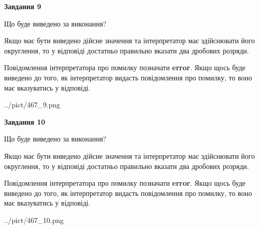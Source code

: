\documentclass[12pt, ukrainian]{article}
\begin{document}
{\begin {Large}
{\begin {center}\textbf{Завдання 9}\end {center}}\par
Що буде виведено за виконання? \par

Якщо має бути виведено дійсне значення та інтерпретатор має здійснювати його округлення, 
то у відповіді достатньо правильно вказати два дробових розряди.

Повідомлення інтерпретатора про помилку позначати \textbf{error}.
Якщо щось буде виведено до того, як інтерпретатор видасть повідомлення про помилку, 
то воно має вказуватись у відповіді. \par

\begin{center}
	{../pict/467_9.png}
\end{center}
\newpage

{\begin {center}\textbf{Завдання 10}\end {center}}\par
Що буде виведено за виконання? \par

Якщо має бути виведено дійсне значення та інтерпретатор має здійснювати його округлення, 
то у відповіді достатньо правильно вказати два дробових розряди.

Повідомлення інтерпретатора про помилку позначати \textbf{error}.
Якщо щось буде виведено до того, як інтерпретатор видасть повідомлення про помилку, 
то воно має вказуватись у відповіді. \par

\begin{center}
	{../pict/467_10.png}
\end{center}
\newpage

\end {Large}}
\end{document}
